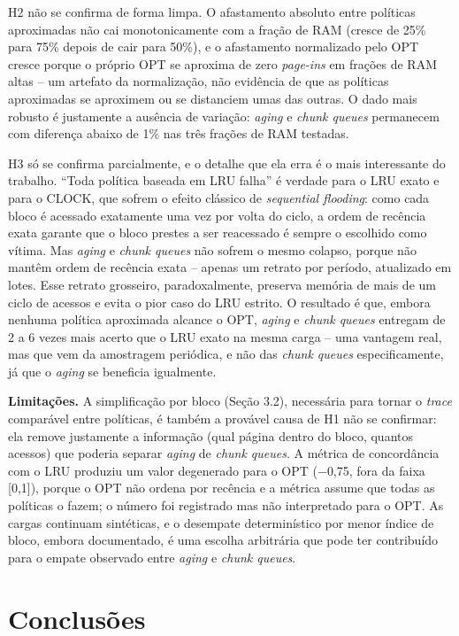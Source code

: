 \documentclass[12pt]{article}
\begin{document}
H2 não se confirma de forma limpa. O afastamento absoluto entre políticas aproximadas não cai monotonicamente com a fração de RAM (cresce de 25\% para 75\% depois de cair para 50\%), e o afastamento normalizado pelo OPT cresce porque o próprio OPT se aproxima de zero \textit{page-ins} em frações de RAM altas -- um artefato da normalização, não evidência de que as políticas aproximadas se aproximem ou se distanciem umas das outras. O dado mais robusto é justamente a ausência de variação: \textit{aging} e \textit{chunk queues} permanecem com diferença abaixo de 1\% nas três frações de RAM testadas.

H3 só se confirma parcialmente, e o detalhe que ela erra é o mais interessante do trabalho. ``Toda política baseada em LRU falha'' é verdade para o LRU exato e para o CLOCK, que sofrem o efeito clássico de \textit{sequential flooding}: como cada bloco é acessado exatamente uma vez por volta do ciclo, a ordem de recência exata garante que o bloco prestes a ser reacessado é sempre o escolhido como vítima. Mas \textit{aging} e \textit{chunk queues} não sofrem o mesmo colapso, porque não mantêm ordem de recência exata -- apenas um retrato por período, atualizado em lotes. Esse retrato grosseiro, paradoxalmente, preserva memória de mais de um ciclo de acessos e evita o pior caso do LRU estrito. O resultado é que, embora nenhuma política aproximada alcance o OPT, \textit{aging} e \textit{chunk queues} entregam de 2 a 6 vezes mais acerto que o LRU exato na mesma carga -- uma vantagem real, mas que vem da amostragem periódica, e não das \textit{chunk queues} especificamente, já que o \textit{aging} se beneficia igualmente.

\textbf{Limitações.} A simplificação por bloco (Seção 3.2), necessária para tornar o \textit{trace} comparável entre políticas, é também a provável causa de H1 não se confirmar: ela remove justamente a informação (qual página dentro do bloco, quantos acessos) que poderia separar \textit{aging} de \textit{chunk queues}. A métrica de concordância com o LRU produziu um valor degenerado para o OPT ($-$0,75, fora da faixa [0,1]), porque o OPT não ordena por recência e a métrica assume que todas as políticas o fazem; o número foi registrado mas não interpretado para o OPT. As cargas continuam sintéticas, e o desempate determinístico por menor índice de bloco, embora documentado, é uma escolha arbitrária que pode ter contribuído para o empate observado entre \textit{aging} e \textit{chunk queues}.

\section{Conclusões}
\end{document}
